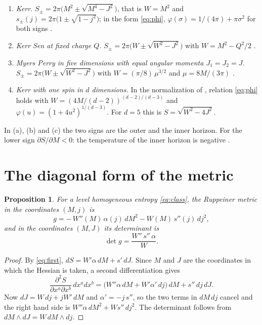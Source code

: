 \documentclass[11pt]{article}
\newtheorem{proposition}{Proposition}
\theoremstyle{definition}
\theoremstyle{remark}
\begin{document}
\begin{enumerate}
\item[(a)] \emph{Kerr.} $S_{\pm}=2\pi\bigl(M^{2}\pm\sqrt{M^{4}-J^{2}}\bigr)$, that is $W=M^{2}$ and $s_{\pm}(j)=2\pi\bigl(1\pm\sqrt{1-j^{2}}\bigr)$; in the form \eqref{eq:phi}, $\varphi(\sigma)=1/(4\pi)+\pi\sigma^{2}$ for both signs \cite{ABP15}.
\item[(b)] \emph{Kerr Sen at fixed charge $Q$.} $S_{\pm}=2\pi\bigl(W\pm\sqrt{W^{2}-J^{2}}\bigr)$ with $W=M^{2}-Q^{2}/2$ \cite{Sen,Pra}.
\item[(c)] \emph{Myers Perry in five dimensions with equal angular momenta $J_{1}=J_{2}=J$.} $S_{\pm}=2\pi\bigl(W\pm\sqrt{W^{2}-J^{2}}\bigr)$ with $W=(\pi/8)\,\mu^{3/2}$ and $\mu=8M/(3\pi)$ \cite{MP,BMMA}.
\item[(d)] \emph{Kerr with one spin in $d$ dimensions.} In the normalization of \cite{AP06}, relation \eqref{eq:phi} holds with $W=(4M/(d-2))^{(d-2)/(d-3)}$ and $\varphi(u)=(1+4u^{2})^{1/(d-3)}$. For $d=5$ this is $S=\sqrt{W^{2}-4J^{2}}$.
\end{enumerate}
In (a), (b) and (c) the two signs are the outer and the inner horizon. For the lower sign $\partial S/\partial M<0$: the temperature of the inner horizon is negative \cite{ABP15}.

\section{The diagonal form of the metric}\label{sec:diag}

\begin{proposition}\label{prop:diag}
For a level homogeneous entropy \eqref{eq:class}, the Ruppeiner metric in the coordinates $(M,j)$ is
\begin{equation}\label{eq:diag}
g=-\,W''(M)\,\alpha(j)\,dM^{2}-W(M)\,s''(j)\,dj^{2} ,
\end{equation}
and in the coordinates $(M,J)$ its determinant is
\begin{equation}\label{eq:det}
\det g=\frac{W''\,s''\,\alpha}{W} .
\end{equation}
\end{proposition}

\begin{proof}
By \eqref{eq:first}, $dS=W'\alpha\,dM+s'\,dJ$. Since $M$ and $J$ are the coordinates in which the Hessian is taken, a second differentiation gives
\[
\frac{\partial^{2}S}{\partial x^{a}\partial x^{b}}\,dx^{a}dx^{b}
=\bigl(W''\alpha\,dM+W'\alpha'\,dj\bigr)\,dM+s''\,dj\,dJ .
\]
Now $dJ=W\,dj+jW'\,dM$ and $\alpha'=-j\,s''$, so the two terms in $dM\,dj$ cancel and the right hand side is $W''\alpha\,dM^{2}+W s''\,dj^{2}$. The determinant follows from $dM\wedge dJ=W\,dM\wedge dj$.
\end{proof}
\end{document}
